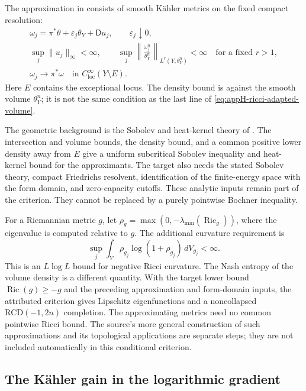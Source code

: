 The approximation in
\cite[Proposition~5.1 and equation~(2.2)]{GSS26RicciEntropyV1}
consists of smooth Kähler metrics on the fixed compact resolution:
\[
 \begin{gathered}
 \omega_j=\pi^*\theta+\varepsilon_j\theta_Y+\mathsf D u_j,
             \qquad\varepsilon_j\downarrow0,\\
 \sup_j\|u_j\|_\infty<\infty,\qquad
 \sup_j\left\|\frac{\omega_j^n}{\theta_Y^n}
                 \right\|_{L^r(Y,\theta_Y^n)}<\infty
                      \quad\text{for a fixed }r>1,\\
 \omega_j\longrightarrow\pi^*\omega
                \quad\text{in }C^\infty_{\mathrm{loc}}(Y\setminus E).
 \end{gathered}
 \tag{H.158}\label{eq:appH-ricci-approximation}
\]
Here \(E\) contains the exceptional locus. The density bound is
against the smooth volume \(\theta_Y^n\); it is not the same
condition as the last line of \eqref{eq:appH-ricci-adapted-volume}.

The geometric background is the Sobolev and heat-kernel theory of
\cite{GPSS23SobolevV1}. The intersection and volume bounds, the
density bound, and a common positive lower density away from \(E\)
give a uniform subcritical Sobolev inequality and heat-kernel
bound for the approximants. The target also needs the stated
Sobolev theory, compact Friedrichs resolvent, identification of
the finite-energy space with the form domain, and zero-capacity
cutoffs. These analytic inputs remain part of the criterion.
They cannot be replaced by a purely pointwise Bochner inequality.

For a Riemannian metric \(g\), let
\(\rho_g=\max(0,-\lambda_{\min}(\operatorname{Ric}_g))\),
where the eigenvalue is computed relative to \(g\). The additional
curvature requirement is
\[
 \sup_j\int_Y\rho_{g_j}\log(1+\rho_{g_j})\,dV_{g_j}<\infty.
 \tag{H.159}\label{eq:appH-ricci-entropy-bound}
\]
This is an \(L\log L\) bound for negative Ricci curvature.
The Nash entropy of the volume density is a different quantity.
With the target lower bound \(\operatorname{Ric}(g)\geq-g\)
and the preceding approximation and form-domain inputs,
the attributed criterion gives Lipschitz eigenfunctions and
a noncollapsed \(\mathrm{RCD}(-1,2n)\) completion.
The approximating metrics need no common pointwise Ricci bound.
The source's more general construction of such approximations
and its topological applications are separate steps; they are
not included automatically in this conditional criterion.

\subsection{The Kähler gain in the logarithmic gradient}

